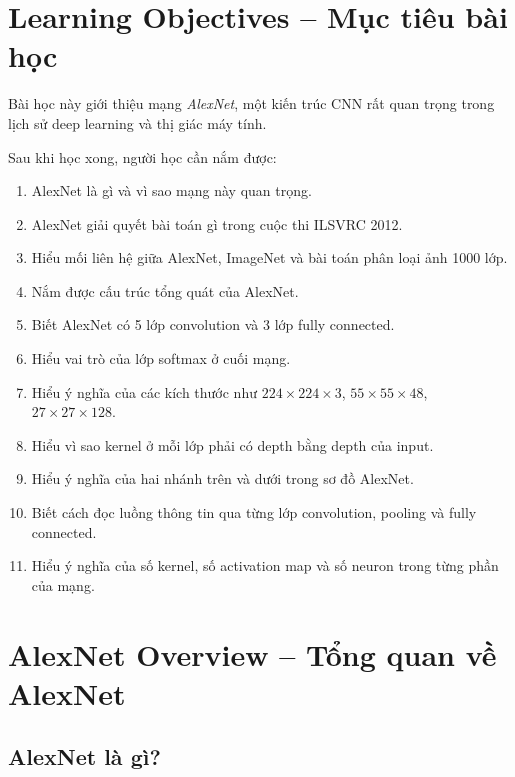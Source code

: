 \section*{Learning Objectives -- Mục tiêu bài học}

Bài học này giới thiệu mạng \textit{AlexNet}, một kiến trúc CNN rất quan trọng trong lịch sử deep learning và thị giác máy tính.

Sau khi học xong, người học cần nắm được:

\begin{enumerate}[label=\arabic*.]
    \item AlexNet là gì và vì sao mạng này quan trọng.
    \item AlexNet giải quyết bài toán gì trong cuộc thi ILSVRC 2012.
    \item Hiểu mối liên hệ giữa AlexNet, ImageNet và bài toán phân loại ảnh 1000 lớp.
    \item Nắm được cấu trúc tổng quát của AlexNet.
    \item Biết AlexNet có 5 lớp convolution và 3 lớp fully connected.
    \item Hiểu vai trò của lớp softmax ở cuối mạng.
    \item Hiểu ý nghĩa của các kích thước như $224\times224\times3$, $55\times55\times48$, $27\times27\times128$.
    \item Hiểu vì sao kernel ở mỗi lớp phải có depth bằng depth của input.
    \item Hiểu ý nghĩa của hai nhánh trên và dưới trong sơ đồ AlexNet.
    \item Biết cách đọc luồng thông tin qua từng lớp convolution, pooling và fully connected.
    \item Hiểu ý nghĩa của số kernel, số activation map và số neuron trong từng phần của mạng.
\end{enumerate}

\section{AlexNet Overview -- Tổng quan về AlexNet}

\subsection{AlexNet là gì?}

